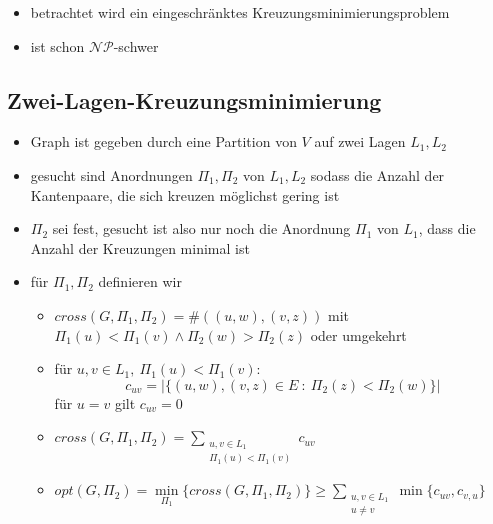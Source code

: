 \begin{itemize}[itemsep=-1pt]
	\item betrachtet wird ein eingeschränktes Kreuzungsminimierungsproblem
	\item ist schon $\mathcal{NP}$-schwer
\end{itemize}
\subsection{Zwei-Lagen-Kreuzungsminimierung}
\begin{itemize}[itemsep=-1pt]
	\item Graph ist gegeben durch eine Partition von $V$ auf zwei Lagen $L_1,L_2$
	\item gesucht sind Anordnungen $\Pi_1,\Pi_2$ von $L_1,L_2$ sodass die Anzahl der Kantenpaare, die sich kreuzen möglichst gering ist
	\item $\Pi_2$ sei fest, gesucht ist also nur noch die Anordnung $\Pi_1$ von $L_1$, dass die Anzahl der Kreuzungen minimal ist
	\item für $\Pi_1,\Pi_2$ definieren wir
		\begin{itemize}
			\item $cross(G,\Pi_1,\Pi_2)=\# ((u,w),(v,z))$ mit $\Pi_1(u)<\Pi_1(v) \wedge \Pi_2(w)>\Pi_2(z)$ oder umgekehrt
			\item für $u,v\in L_1,~\Pi_1(u)<\Pi_1(v)$:
				\[c_{uv}=|\{(u,w),(v,z)\in E~:~\Pi_2(z)<\Pi_2(w)\}|\]
				für $u=v$ gilt $c_{uv}=0$
			\item $cross(G,\Pi_1,\Pi_2)=\sum\limits_{\substack{u,v\in L_1\\\Pi_1(u)<\Pi_1(v)}} c_{uv}$
			\item $opt(G,\Pi_2)=\min\limits_{\Pi_1}\{cross(G,\Pi_1,\Pi_2)\} \geq \sum\limits_{\substack{u,v\in L_1\\u\neq v}}\min\{c_{uv},c_{v,u}\}$
		\end{itemize}
\end{itemize}